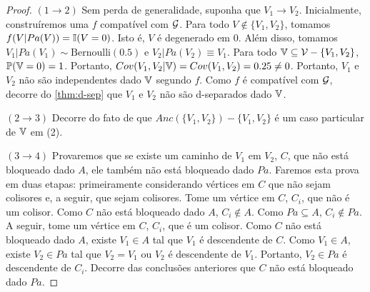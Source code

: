 \begin{proof}
 $(1 \rightarrow 2)$ Sem perda de generalidade, suponha que $V_1 \rightarrow V_2$.
 Inicialmente, construíremos uma $f$ compatível com ${\mathcal G}$. 
 Para todo $V \notin \{V_1,V_2\}$, tomamos $f(V|Pa(V)) = {\mathbb I}(V = 0)$.
 Isto é, $V$ é degenerado em $0$. Além disso, tomamos
 $V_1|Pa(V_1) \sim \text{Bernoulli}(0.5)$ e
 $V_2|Pa(V_2) \equiv V_1$.
 Para todo ${\mathbb V} \subseteq {\mathcal V} - \{V_1,V_2\}$, ${\mathbb P}({\mathbb V} = 0) = 1$.
 Portanto, $Cov(V_1, V_2|{\mathbb V}) = Cov(V_1, V_2) = 0.25 \neq 0$.
 Portanto, $V_1$ e $V_2$ não são independentes dado ${\mathbb V}$ segundo $f$.
 Como $f$ é compatível com ${\mathcal G}$, 
 decorre do \cref{thm:d-sep} que
 $V_1$ e $V_2$ não são d-separados dado ${\mathbb V}$.
 
 $(2 \rightarrow 3)$ Decorre do fato de que
 $Anc(\{V_1,V_2\}) - \{V_1,V_2\}$ é 
 um caso particular de ${\mathbb V}$ em (2).
  
 $(3 \rightarrow 4)$
 Provaremos que se existe um caminho de $V_1$ em $V_2$, $C$, que 
 não está bloqueado dado $A$, 
 ele também não está bloqueado dado $Pa$.
 Faremos esta prova em duas etapas: 
 primeiramente considerando vértices em $C$ que 
 não sejam colisores e, a seguir, que sejam colisores.
 Tome um vértice em $C$, $C_i$, que não é um colisor.
 Como $C$ não está bloqueado dado $A$, $C_i \notin A$.
 Como $Pa \subseteq A$, $C_i \notin Pa$.
 A seguir, tome um vértice em $C$, $C_i$, que é um colisor.
 Como $C$ não está bloqueado dado $A$,
 existe $V_1 \in A$ tal que $V_1$ é descendente de $C$.
 Como $V_1 \in A$, existe $V_2 \in Pa$ tal que 
 $V_2 = V_1$ ou $V_2$ é descendente de $V_1$. 
 Portanto, $V_2 \in Pa$ é descendente de $C_i$.
 Decorre das conclusões anteriores que 
 $C$ não está bloqueado dado $Pa$.
 

\end{proof}

